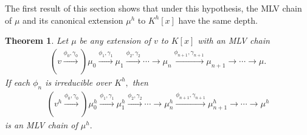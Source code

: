 \documentclass[11pt]{amsart}
\newtheorem{theorem}{Theorem}[section]
\theoremstyle{definition}
\theoremstyle{remark}
\numberwithin{equation}{section}
\begin{document}
 The first result of this section shows that under this hypothesis, the MLV chain of $\mu$ and its canonical extension $\mu^h$ to $K^h[x]$ have the same depth.
 \begin{theorem}
 	Let $\mu$ be any extension of $v$ to $K[x]$ with an MLV chain \begin{align*}
 		(v\xrightarrow{\phi_0,\gamma_0})\mu_0\xrightarrow{\phi_1,\gamma_1} \mu_1\xrightarrow{\phi_2,\gamma_2}\cdots \longrightarrow \mu_{n}\xrightarrow{\phi_{n+1},\gamma_{n+1}} \mu_{n+1}\longrightarrow\cdots\longrightarrow \mu. 
 	\end{align*}
 	If each $\phi_n$ is irreducible over $K^h,$ then \begin{align}\label{edf1}
 		(v^h\xrightarrow{\phi_0,\gamma_0})\mu_0^h\xrightarrow{\phi_1,\gamma_1} \mu_1^h\xrightarrow{\phi_2,\gamma_2}\cdots \longrightarrow \mu_{n}^h\xrightarrow{\phi_{n+1},\gamma_{n+1}} \mu_{n+1}^h\longrightarrow\cdots\longrightarrow \mu^h 
 	\end{align} is an MLV chain of $\mu^h.$
 	\end{theorem}
\end{document}
